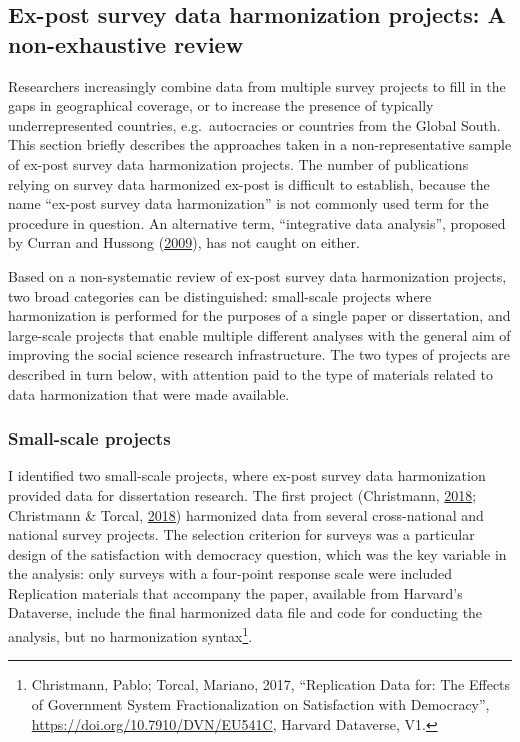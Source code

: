 \documentclass[12pt,]{article}
\let\rmarkdownfootnote\footnote%
\def\footnote{\protect\rmarkdownfootnote}
\begin{document}
\hypertarget{ex-post-survey-data-harmonization-projects-a-non-exhaustive-review}{%
\subsection{Ex-post survey data harmonization projects: A non-exhaustive review}\label{ex-post-survey-data-harmonization-projects-a-non-exhaustive-review}}

Researchers increasingly combine data from multiple survey projects to fill in the gaps in geographical coverage, or to increase the presence of typically underrepresented countries, e.g.~autocracies or countries from the Global South. This section briefly describes the approaches taken in a non-representative sample of ex-post survey data harmonization projects. The number of publications relying on survey data harmonized ex-post is difficult to establish, because the name ``ex-post survey data harmonization'' is not commonly used term for the procedure in question. An alternative term, ``integrative data analysis'', proposed by Curran and Hussong (\protect\hyperlink{ref-Curran2009}{2009}), has not caught on either.

Based on a non-systematic review of ex-post survey data harmonization projects, two broad categories can be distinguished: small-scale projects where harmonization is performed for the purposes of a single paper or dissertation, and large-scale projects that enable multiple different analyses with the general aim of improving the social science research infrastructure. The two types of projects are described in turn below, with attention paid to the type of materials related to data harmonization that were made available.

\hypertarget{small-scale-projects}{%
\subsubsection{Small-scale projects}\label{small-scale-projects}}

I identified two small-scale projects, where ex-post survey data harmonization provided data for dissertation research. The first project (Christmann, \protect\hyperlink{ref-Christmann2018}{2018}; Christmann \& Torcal, \protect\hyperlink{ref-Christmann2018a}{2018}) harmonized data from several cross-national and national survey projects. The selection criterion for surveys was a particular design of the satisfaction with democracy question, which was the key variable in the analysis: only surveys with a four-point response scale were included Replication materials that accompany the paper, available from Harvard's Dataverse, include the final harmonized data file and code for conducting the analysis, but no harmonization syntax\footnote{Christmann, Pablo; Torcal, Mariano, 2017, ``Replication Data for: The Effects of Government System Fractionalization on Satisfaction with Democracy'', \url{https://doi.org/10.7910/DVN/EU541C}, Harvard Dataverse, V1.}.
\end{document}
